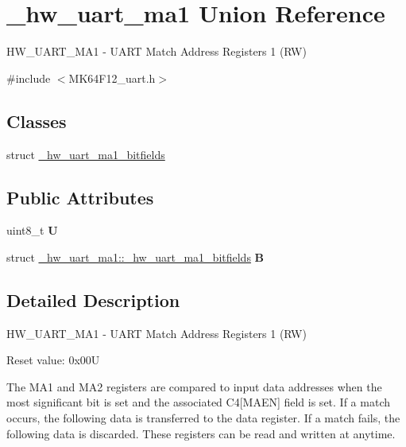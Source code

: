 \hypertarget{union__hw__uart__ma1}{}\section{\+\_\+hw\+\_\+uart\+\_\+ma1 Union Reference}
\label{union__hw__uart__ma1}


H\+W\+\_\+\+U\+A\+R\+T\+\_\+\+M\+A1 -\/ U\+A\+RT Match Address Registers 1 (RW)  




{\ttfamily \#include $<$M\+K64\+F12\+\_\+uart.\+h$>$}

\subsection*{Classes}
\begin{DoxyCompactItemize}
\item 
struct \hyperlink{struct__hw__uart__ma1_1_1__hw__uart__ma1__bitfields}{\+\_\+hw\+\_\+uart\+\_\+ma1\+\_\+bitfields}
\end{DoxyCompactItemize}
\subsection*{Public Attributes}
\begin{DoxyCompactItemize}
\item 
uint8\+\_\+t {\bfseries U}\hypertarget{union__hw__uart__ma1_a5582f6f672be9cd67d322bffcb56781d}{}\label{union__hw__uart__ma1_a5582f6f672be9cd67d322bffcb56781d}

\item 
struct \hyperlink{struct__hw__uart__ma1_1_1__hw__uart__ma1__bitfields}{\+\_\+hw\+\_\+uart\+\_\+ma1\+::\+\_\+hw\+\_\+uart\+\_\+ma1\+\_\+bitfields} {\bfseries B}\hypertarget{union__hw__uart__ma1_a80135d335cd67615f0fe31890ae41f81}{}\label{union__hw__uart__ma1_a80135d335cd67615f0fe31890ae41f81}

\end{DoxyCompactItemize}


\subsection{Detailed Description}
H\+W\+\_\+\+U\+A\+R\+T\+\_\+\+M\+A1 -\/ U\+A\+RT Match Address Registers 1 (RW) 

Reset value\+: 0x00U

The M\+A1 and M\+A2 registers are compared to input data addresses when the most significant bit is set and the associated C4\mbox{[}M\+A\+EN\mbox{]} field is set. If a match occurs, the following data is transferred to the data register. If a match fails, the following data is discarded. These registers can be read and written at anytime. 

